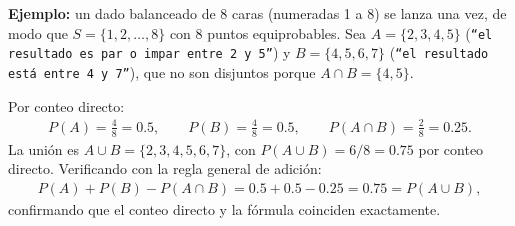 \begin{solproblema}[prob:b993271]
	\textbf{Ejemplo:} un dado balanceado de 8 caras (numeradas 1 a 8) se lanza una vez, de modo que $S=\{1,2,\dots,8\}$ con $8$ puntos equiprobables. Sea $A=\{2,3,4,5\}$ (\texttt{``el resultado es par o impar entre 2 y 5''}) y $B=\{4,5,6,7\}$ (\texttt{``el resultado está entre 4 y 7''}), que no son disjuntos porque $A\cap B=\{4,5\}$.

	Por conteo directo:
	\begin{align}
		P(A) = \frac{4}{8}=0.5, \qquad P(B) = \frac{4}{8}=0.5, \qquad P(A\cap B) = \frac{2}{8}=0.25.
	\end{align}
	La unión es $A\cup B=\{2,3,4,5,6,7\}$, con $P(A\cup B)=6/8=0.75$ por conteo directo. Verificando con la regla general de adición:
	\begin{align}
		P(A) + P(B) - P(A\cap B) = 0.5+0.5-0.25 = 0.75 = P(A\cup B),
	\end{align}
	confirmando que el conteo directo y la fórmula coinciden exactamente.
\end{solproblema}
